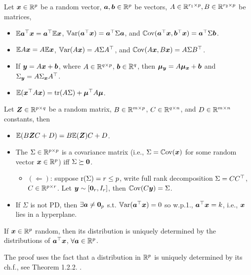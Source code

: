 \documentclass[10pt,a4paper]{book}
\begin{document}
\begin{thmbox}
	\begin{proposition}\label{prop:random_vector_moments}
		Let $\x\in\bbR^p$ be a random vector, $\a,\b\in\bbR^p$ be vectors, $A\in\bbR^{r_1\times p},B\in\bbR^{r_2\times p}$ be matrices,  
		\begin{itemize}
			\item $\bbE \a^\TT\x=\a^\TT \bbE\x$, $\Var(\a^\TT \x)=\a^\TT\Sigma\a$, and $\Cov(\a^\TT\x,\b^\TT\x)=\a^\TT \Sigma\b$.
			\item $\bbE A\x=A\bbE \x$, $\Var(A\x)=A\Sigma A^\TT$, and $\Cov(A\x,B\x)=A\Sigma B^\TT$.
			\item If $\y=A\x+\b$, where $A\in\bbR^{q\times p}$, $\b\in\bbR^{q}$, then $\bam_\y=A \bam_\x+\b$ and $\Sigma_\y=A\Sigma_\x A^\TT$.    
			\item $\bbE(\x^\TT A\x)=\tr(A\Sigma)+\bam^\TT A\bam$.  
		\end{itemize}  
		Let $\Z\in\bbR^{p\times q}$ be a random matrix, $B\in\bbR^{m\times p}$, $C\in\bbR^{q\times n}$, and $D\in\bbR^{m\times n}$ constants, then 
		\begin{itemize}
			\item $\bbE (B\Z C+D) = B \bbE (\Z) C+D$. 
		\end{itemize}   
	\end{proposition}
\end{thmbox}
\begin{itemize}
	\item The $\Sigma\in\bbR^{p\times p}$ is a covariance matrix (i.e., $\Sigma=\Cov(\x)$ for some random vector $\x\in\bbR^p$) iff $\Sigma\succeq \0$.
	\begin{itemize}
		\item \small $(\Leftarrow)$: suppose $\rmr(\Sigma)=r\leq p$, write full rank decomposition $\Sigma=C C^\TT$, $C\in\bbR^{p\times r}$. Let $\y\sim[\0_r,I_r]$, then $\Cov(C\y)=\Sigma$.    
	\end{itemize}
	\item If $\Sigma$ is not PD, then $\exists \a\neq\0_p$ s.t. $\Var(\a^\TT \x)=0$ so w.p.1., $\a^\TT \x=k$, i.e., $\x$ lies in a hyperplane.     
\end{itemize}

\begin{thmbox}
	\begin{theorem}\label{thm:rv_uni_linearFun}
		If $\x\in\bbR^p$ random, then its distribution is uniquely determined by the distributions of $\a^\TT \x$, $\forall \a\in\bbR^p$.  
	\end{theorem}
\end{thmbox}
The proof uses the fact that a distribution in $\bbR^p$ is uniquely determined by its ch.f., see Theorem 1.2.2. \cite{muirhead1982aspects}.
\end{document}
